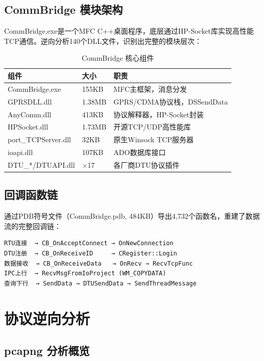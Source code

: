\documentclass[12pt,a4paper]{ctexart}
\begin{document}
\subsection{CommBridge 模块架构}

CommBridge.exe是一个MFC C++桌面程序，底层通过HP-Socket库实现高性能TCP通信。逆向分析140个DLL文件，识别出完整的模块层次：

\begin{table}[H]\centering
\caption{CommBridge 核心组件}
\begin{tabular}{p{3.5cm}p{2cm}p{5cm}}
\toprule
\textbf{组件} & \textbf{大小} & \textbf{职责} \\
\midrule
CommBridge.exe & 155KB & MFC主框架，消息分发 \\
GPRSDLL.dll & 1.38MB & GPRS/CDMA协议栈，DSSendData \\
AnyComm.dll & 413KB & 协议解释器，HP-Socket封装 \\
HPSocket.dll & 1.73MB & 开源TCP/UDP高性能库 \\
port\_TCPServer.dll & 32KB & 原生Winsock TCP服务器 \\
ioapi.dll & 107KB & ADO数据库接口 \\
DTU\_*/DTUAPI.dll & $\times$17 & 各厂商DTU协议插件 \\
\bottomrule
\end{tabular}
\end{table}

\subsection{回调函数链}

通过PDB符号文件（CommBridge.pdb, 484KB）导出4,732个函数名，重建了数据流的完整回调链：

\begin{verbatim}
RTU连接  → CB_OnAcceptConnect → OnNewConnection
DTU注册  → CB_OnReceiveID     → CRegister::Login
数据接收  → CB_OnReceiveData   → OnRecv → RecvTcpFunc
IPC上行  → RecvMsgFromIoProject (WM_COPYDATA)
查询下行  → SendData → DTUSendData → SendThreadMessage
\end{verbatim}

\section{协议逆向分析}

\subsection{pcapng 分析概览}
\end{document}
